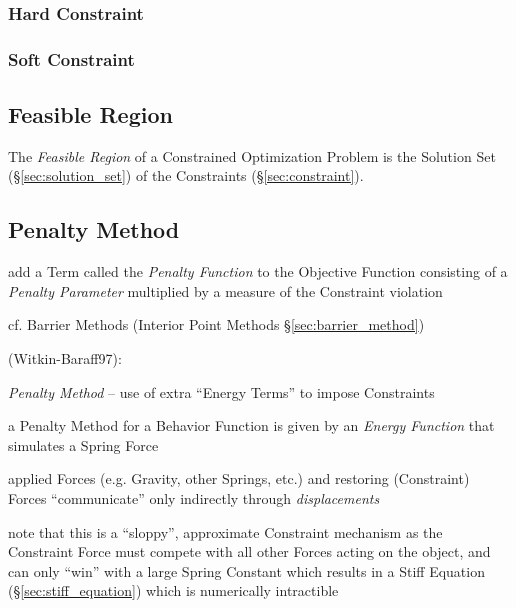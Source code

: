 \subsubsection{Hard Constraint}\label{sec:hard_constraint}

\subsubsection{Soft Constraint}\label{sec:soft_constraint}



\subsection{Feasible Region}\label{sec:feasible_region}

The \emph{Feasible Region} of a Constrained Optimization Problem is the
Solution Set (\S\ref{sec:solution_set}) of the Constraints
(\S\ref{sec:constraint}).



\subsection{Penalty Method}\label{sec:penalty_method}

add a Term called the \emph{Penalty Function} to the Objective Function
consisting of a \emph{Penalty Parameter} multiplied by a measure of the
Constraint violation

cf. Barrier Methods (Interior Point Methods \S\ref{sec:barrier_method})

(Witkin-Baraff97):

\emph{Penalty Method} -- use of extra ``Energy Terms'' to impose Constraints

a Penalty Method for a Behavior Function is given by an \emph{Energy Function}
that simulates a Spring Force

applied Forces (e.g. Gravity, other Springs, etc.) and restoring (Constraint)
Forces ``communicate'' only indirectly through \emph{displacements}

note that this is a ``sloppy'', approximate Constraint mechanism as the
Constraint Force must compete with all other Forces acting on the object, and
can only ``win'' with a large Spring Constant which results in a Stiff Equation
(\S\ref{sec:stiff_equation}) which is numerically intractible

